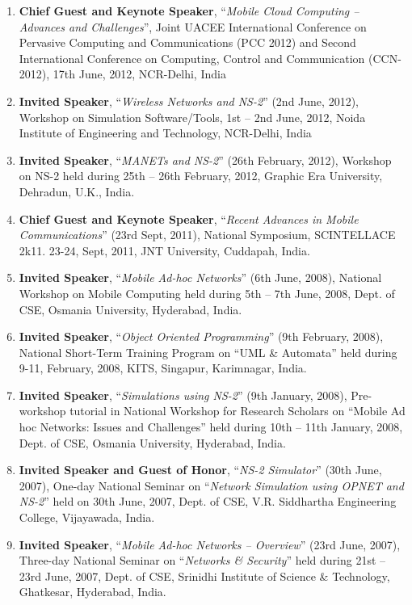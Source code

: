 \begin{enumerate}
\item
\textbf{Chief Guest and Keynote Speaker}, “\textit{Mobile Cloud Computing – Advances and Challenges}”, Joint UACEE International Conference on Pervasive Computing and Communications (PCC 2012) and Second International Conference on Computing, Control and Communication (CCN-2012), 17th June, 2012, NCR-Delhi, India

\item
\textbf{Invited Speaker}, “\textit{Wireless Networks and NS-2}” (2nd June, 2012), Workshop on Simulation Software/Tools, 1st – 2nd June, 2012, Noida Institute of Engineering and Technology, NCR-Delhi, India

\item
\textbf{Invited Speaker}, “\textit{MANETs and NS-2}” (26th February, 2012), Workshop on NS-2 held during 25th – 26th February, 2012, Graphic Era University, Dehradun, U.K., India.

\item
\textbf{Chief Guest and Keynote Speaker}, “\textit{Recent Advances in Mobile Communications}” (23rd Sept, 2011), National Symposium, SCINTELLACE 2k11. 23-24, Sept, 2011, JNT University, Cuddapah, India.

\item
\textbf{Invited Speaker}, “\textit{Mobile Ad-hoc Networks}” (6th June, 2008), National Workshop on Mobile Computing held during 5th – 7th June, 2008, Dept. of CSE, Osmania University, Hyderabad, India.

\item
\textbf{Invited Speaker}, “\textit{Object Oriented Programming}” (9th February, 2008), National Short-Term Training Program on “UML \& Automata” held during   9-11, February, 2008, KITS, Singapur, Karimnagar, India.

\item
\textbf{Invited Speaker}, “\textit{Simulations using NS-2}” (9th January, 2008), Pre-workshop tutorial in National Workshop for Research Scholars on “Mobile Ad hoc Networks: Issues and Challenges” held during 10th – 11th January, 2008, Dept. of CSE, Osmania University, Hyderabad, India.

\item
\textbf{Invited Speaker and Guest of Honor}, “\textit{NS-2 Simulator}” (30th June, 2007),  One-day National Seminar on “\textit{Network Simulation using OPNET and NS-2}” held on 30th June, 2007, Dept. of CSE, V.R. Siddhartha Engineering College, Vijayawada, India.

\item
\textbf{Invited Speaker}, “\textit{Mobile Ad-hoc Networks – Overview}” (23rd June, 2007),  Three-day National Seminar on “\textit{Networks \& Security}” held during 21st – 23rd June, 2007, Dept. of CSE, Srinidhi Institute of Science \& Technology, Ghatkesar, Hyderabad, India.


\end{enumerate}
